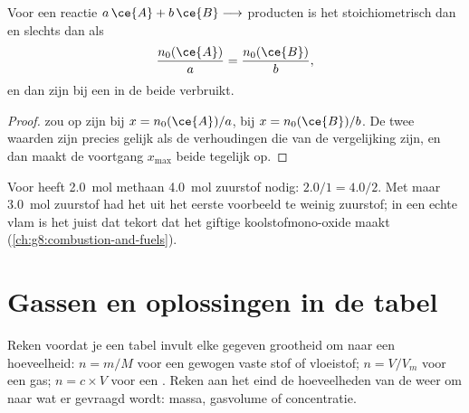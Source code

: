 \begin{proposition}\label{prop:g10:reaction-progress-table:together}
Voor een reactie $a\,\ce{A} + b\,\ce{B} \longrightarrow$ producten is het  stoichiometrisch dan en
slechts dan als
\[
  \frac{n_0(\ce{A})}{a} = \frac{n_0(\ce{B})}{b},
\]
en dan zijn bij een  in de  beide
 verbruikt.
\end{proposition}

\begin{proof}
 zou op zijn bij $x = n_0(\ce{A})/a$,  bij $x = n_0(\ce{B})/b$.
De twee waarden zijn precies gelijk als de verhoudingen die van de
vergelijking zijn, en dan maakt de voortgang $x_{\max}$ beide tegelijk
op.
\end{proof}

\begin{example}\label{ex:g10:reaction-progress-table:stoich}
Voor  heeft \qty{2.0}{mol} methaan
\qty{4.0}{mol} zuurstof nodig: $2.0/1 = 4.0/2$. Met maar \qty{3.0}{mol}
zuurstof had het  uit het eerste voorbeeld te weinig zuurstof; in
een echte vlam is het juist dat tekort dat het giftige koolstofmono-oxide
maakt (\cref{ch:g8:combustion-and-fuels}).
\end{example}

\section{Gassen en oplossingen in de tabel}


\begin{method}\label{met:g10:reaction-progress-table:amounts}
Reken voordat je een tabel invult elke gegeven grootheid om naar een
hoeveelheid: $n = m/M$ voor een gewogen vaste stof of vloeistof;
$n = V/V_m$ voor een gas; $n = c \times V$ voor een . Reken
aan het eind de hoeveelheden van de  weer om naar wat er
gevraagd wordt: massa, gasvolume of concentratie.
\end{method}

